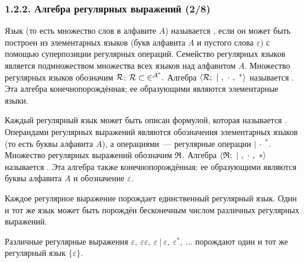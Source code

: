 \begin{frame}
\frametitle{1.2.2. Алгебра регулярных выражений (2/8)}


Язык (то есть множество слов в алфавите $A$) называется , если он
может быть построен из элементарных языков (букв алфавита $A$ и пустого слова 
$\varepsilon$)
с помощью суперпозиции регулярных операций. Семейство регулярных языков является подмножеством
множества всех языков над алфавитом $A$.
Множество регулярных языков обозначим $\cal{R}$:
$\cal{R} \subset 2^{A^*}.$
Алгебра $\langle \cal{R}; ~|~, ~\cdot~, ~{}^*\rangle$ называется . Эта алгебра
конечнопорождённая; ее образующими являются
элементарные языки.

\smallskip
Каждый регулярный язык может быть описан формулой, которая называется . Операндами регулярных выражений являются обозначения 
элементарных языков (то есть буквы алфавита $A$), а операциями~--- регулярные операции 
$|~\cdot~{}^*$. 
Множество регулярных выражений обозначим $\frak{R}$.
Алгебра $\langle \frak{R}; ~|~, ~\cdot~, ~*\rangle$ называется .  Эта алгебра
также конечнопорождённая; ее образующими являются
буквы алфавита $A$ и обозначение $\varepsilon$.

\smallskip
Каждое регулярное выражение порождает единственный регулярный язык.
Один и тот же язык может быть порождён бесконечным числом
различных регулярных выражений.
\begin{example}
Различные регулярные выражения 
$\varepsilon,\ \varepsilon\varepsilon,\ \varepsilon~|~\varepsilon,\ \varepsilon^*,\ \dots$
порождают один и тот же регулярный язык $\{\varepsilon\}$. 
\end{example}
  

\end{frame}

